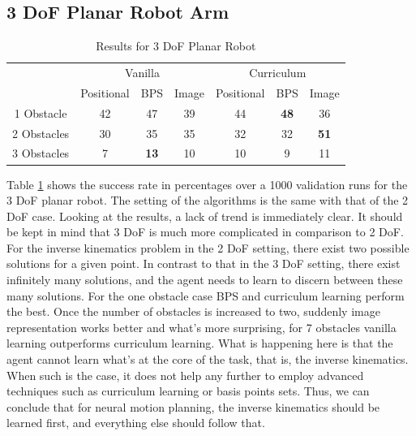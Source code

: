 \documentclass[conference]{IEEEtran}
\begin{document}
\subsection{3 DoF Planar Robot Arm}

\begin{table}[!t]
\renewcommand{\arraystretch}{1.3}
\caption{Results for 3 DoF Planar Robot}
\label{table:2}
\centering
\begin{tabular}{c|ccc|ccc|}
\cline{2-7}
                                  & \multicolumn{3}{c|}{Vanilla}                                       & \multicolumn{3}{c|}{Curriculum}                                    \\ \cline{2-7} 
                                  & \multicolumn{1}{c|}{Positional} & \multicolumn{1}{c|}{BPS} & Image & \multicolumn{1}{c|}{Positional} & \multicolumn{1}{c|}{BPS} & Image \\ \hline
\multicolumn{1}{|c|}{1 Obstacle}  & \multicolumn{1}{c|}{42}          & \multicolumn{1}{c|}{47}   & 39     & \multicolumn{1}{c|}{44}          & \multicolumn{1}{c|}{\textbf{48}}   & 36     \\ \hline
\multicolumn{1}{|c|}{2 Obstacles} & \multicolumn{1}{c|}{30}          & \multicolumn{1}{c|}{35}   & 35     & \multicolumn{1}{c|}{32}          & \multicolumn{1}{c|}{32}   & \textbf{51}     \\ \hline
\multicolumn{1}{|c|}{3 Obstacles} & \multicolumn{1}{c|}{7}          & \multicolumn{1}{c|}{\textbf{13}}   & 10     & \multicolumn{1}{c|}{10}          & \multicolumn{1}{c|}{9}   & 11     \\ \hline
\end{tabular}
\end{table}

Table \ref{table:2} shows the success rate in percentages over a 1000 validation runs for the 3 DoF planar robot. The setting of the algorithms is the same with that of the 2 DoF case. 
Looking at the results, a lack of trend is immediately clear. It should be kept in mind that 3 DoF is much more complicated in comparison to 2 DoF. For the inverse kinematics problem in the 2 DoF setting, there exist two possible solutions for a given point. In contrast to that in the 3 DoF setting, there exist infinitely many solutions, and the agent needs to learn to discern between these many solutions. 
For the one obstacle case BPS and curriculum learning perform the best. Once the number of obstacles is increased to two, suddenly image representation works better and what’s more surprising, for 7 obstacles vanilla learning outperforms curriculum learning. What is happening here is that the agent cannot learn what’s at the core of the task, that is, the inverse kinematics. When such is the case, it does not help any further to employ advanced techniques such as curriculum learning or basis points sets. Thus, we can conclude that for neural motion planning, the inverse kinematics should be learned first, and everything else should follow that. 
\end{document}
